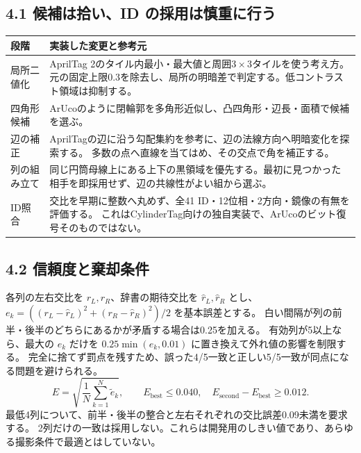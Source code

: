 \documentclass[a4paper,10pt]{ltjsarticle}
\begin{document}
\subsection*{4.1 候補は拾い、ID の採用は慎重に行う}
\noindent\begin{tabularx}{\linewidth}{@{}p{35mm}X@{}}\toprule
段階 & 実装した変更と参考元\\\midrule
局所二値化 & AprilTag 2のタイル内最小・最大値と周囲3\,$\times$\,3タイルを使う考え方。
元の固定上限0.3を除去し、局所の明暗差で判定する。低コントラスト領域は抑制する。\\
四角形候補 & ArUcoのように閉輪郭を多角形近似し、凸四角形・辺長・面積で候補を選ぶ。\\
辺の補正 & AprilTagの辺に沿う勾配集約を参考に、辺の法線方向へ明暗変化を探索する。
多数の点へ直線を当てはめ、その交点で角を補正する。\\
列の組み立て & 同じ円筒母線上にある上下の黒領域を優先する。最初に見つかった相手を即採用せず、辺の共線性がよい組から選ぶ。\\
ID照合 & 交比を早期に整数へ丸めず、全41 ID・12位相・2方向・鏡像の有無を評価する。
これはCylinderTag向けの独自実装で、ArUcoのビット復号そのものではない。\\\bottomrule
\end{tabularx}

\subsection*{4.2 信頼度と棄却条件}
各列の左右交比を $r_L,r_R$、辞書の期待交比を $\hat r_L,\hat r_R$ とし、
$e_k=((r_L-\hat r_L)^2+(r_R-\hat r_R)^2)/2$ を基本誤差とする。
白い間隔が列の前半・後半のどちらにあるかが矛盾する場合は0.25を加える。
有効列が5以上なら、最大の $e_k$ だけを $0.25\min(e_k,0.01)$ に置き換えて外れ値の影響を制限する。
完全に捨てず罰点を残すため、誤った4/5一致と正しい5/5一致が同点になる問題を避けられる。
\[
 E=\sqrt{\frac{1}{N}\sum_{k=1}^{N}\widetilde e_k},\qquad
 E_{\mathrm{best}}\le0.040,\quad
 E_{\mathrm{second}}-E_{\mathrm{best}}\ge0.012.
\]
最低4列について、前半・後半の整合と左右それぞれの交比誤差0.09未満を要求する。
2列だけの一致は採用しない。これらは開発用のしきい値であり、あらゆる撮影条件で最適とはしていない。
\end{document}
